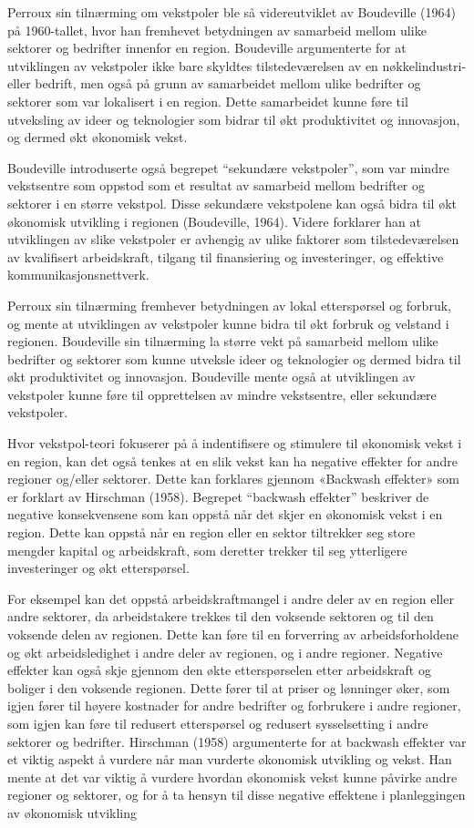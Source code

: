 \documentclass[
]{article}
\begin{document}
Perroux sin tilnærming om vekstpoler ble så videreutviklet av Boudeville
(1964) på 1960-tallet, hvor han fremhevet betydningen av samarbeid
mellom ulike sektorer og bedrifter innenfor en region. Boudeville
argumenterte for at utviklingen av vekstpoler ikke bare skyldtes
tilstedeværelsen av en nøkkelindustri- eller bedrift, men også på grunn
av samarbeidet mellom ulike bedrifter og sektorer som var lokalisert i
en region. Dette samarbeidet kunne føre til utveksling av ideer og
teknologier som bidrar til økt produktivitet og innovasjon, og dermed
økt økonomisk vekst.

Boudeville introduserte også begrepet ``sekundære vekstpoler'', som var
mindre vekstsentre som oppstod som et resultat av samarbeid mellom
bedrifter og sektorer i en større vekstpol. Disse sekundære vekstpolene
kan også bidra til økt økonomisk utvikling i regionen (Boudeville,
1964). Videre forklarer han at utviklingen av slike vekstpoler er
avhengig av ulike faktorer som tilstedeværelsen av kvalifisert
arbeidskraft, tilgang til finansiering og investeringer, og effektive
kommunikasjonsnettverk.

Perroux sin tilnærming fremhever betydningen av lokal etterspørsel og
forbruk, og mente at utviklingen av vekstpoler kunne bidra til økt
forbruk og velstand i regionen. Boudeville sin tilnærming la større vekt
på samarbeid mellom ulike bedrifter og sektorer som kunne utveksle ideer
og teknologier og dermed bidra til økt produktivitet og innovasjon.
Boudeville mente også at utviklingen av vekstpoler kunne føre til
opprettelsen av mindre vekstsentre, eller sekundære vekstpoler.

Hvor vekstpol-teori fokuserer på å indentifisere og stimulere til
økonomisk vekst i en region, kan det også tenkes at en slik vekst kan ha
negative effekter for andre regioner og/eller sektorer. Dette kan
forklares gjennom «Backwash effekter» som er forklart av Hirschman
(1958). Begrepet ``backwash effekter'' beskriver de negative
konsekvensene som kan oppstå når det skjer en økonomisk vekst i en
region. Dette kan oppstå når en region eller en sektor tiltrekker seg
store mengder kapital og arbeidskraft, som deretter trekker til seg
ytterligere investeringer og økt etterspørsel.

For eksempel kan det oppstå arbeidskraftmangel i andre deler av en
region eller andre sektorer, da arbeidstakere trekkes til den voksende
sektoren og til den voksende delen av regionen. Dette kan føre til en
forverring av arbeidsforholdene og økt arbeidsledighet i andre deler av
regionen, og i andre regioner. Negative effekter kan også skje gjennom
den økte etterspørselen etter arbeidskraft og boliger i den voksende
regionen. Dette fører til at priser og lønninger øker, som igjen fører
til høyere kostnader for andre bedrifter og forbrukere i andre regioner,
som igjen kan føre til redusert etterspørsel og redusert sysselsetting i
andre sektorer og bedrifter. Hirschman (1958) argumenterte for at
backwash effekter var et viktig aspekt å vurdere når man vurderte
økonomisk utvikling og vekst. Han mente at det var viktig å vurdere
hvordan økonomisk vekst kunne påvirke andre regioner og sektorer, og for
å ta hensyn til disse negative effektene i planleggingen av økonomisk
utvikling
\end{document}

